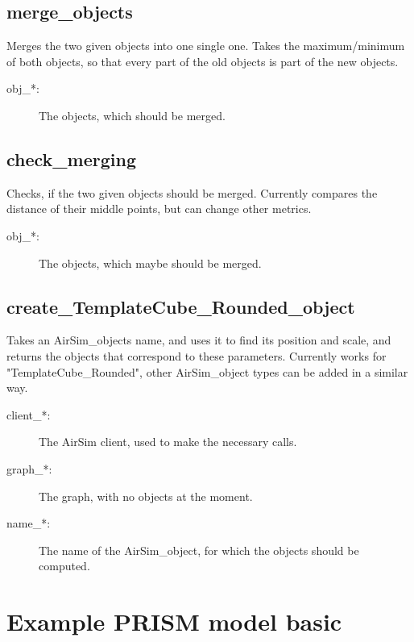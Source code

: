 \documentclass{article}
\begin{document}
\subsection{merge\_objects}
Merges the two given objects into one single one. Takes the maximum/minimum of both objects, so that every part of the old objects is part of the new objects.

\begin{description}
    \item[obj\_*:] The objects, which should be merged.
\end{description}


\subsection{check\_merging}
Checks, if the two given objects should be merged. Currently compares the distance of their middle points, but can change other metrics.

\begin{description}
    \item[obj\_*:] The objects, which maybe should be merged.
\end{description}

\subsection{create\_TemplateCube\_Rounded\_object}
Takes an AirSim\_objects name, and uses it to find its position and scale, and returns the objects that correspond to these parameters. Currently works for "TemplateCube\_Rounded", other AirSim\_object types can be added in a similar way.

\begin{description}
    \item[client\_*:] The AirSim client, used to make the necessary calls.
    \item[graph\_*:] The graph, with no objects at the moment.
    \item[name\_*:] The name of the AirSim\_object, for which the objects should be computed.
\end{description}


\section{Example PRISM model basic}
\end{document}
